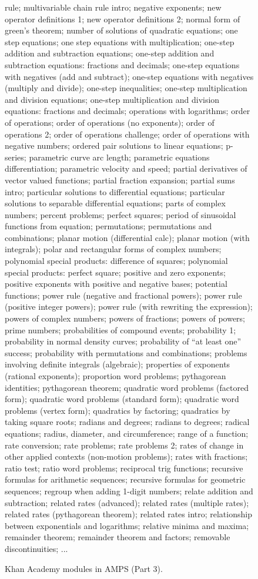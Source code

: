 \documentclass{article}
\begin{document}
\begin{figure*}
rule; multivariable chain rule intro; negative exponents; new operator definitions 1; new operator definitions 2; normal form of green's theorem; number of solutions of quadratic equations; one step equations; one step equations with multiplication; one-step addition and subtraction equations; one-step addition and subtraction equations: fractions and decimals; one-step equations with negatives (add and subtract); one-step equations with negatives (multiply and divide); one-step inequalities; one-step multiplication and division equations; one-step multiplication and division equations: fractions and decimals; operations with logarithms; order of operations; order of operations (no exponents); order of operations 2; order of operations challenge; order of operations with negative numbers; ordered pair solutions to linear equations; p-series; parametric curve arc length; parametric equations differentiation; parametric velocity and speed; partial derivatives of vector valued functions; partial fraction expansion; partial sums intro; particular solutions to differential equations; particular solutions to separable differential equations; parts of complex numbers; percent problems; perfect squares; period of sinusoidal functions from equation; permutations; permutations and combinations; planar motion (differential calc); planar motion (with integrals); polar and rectangular forms of complex numbers; polynomial special products: difference of squares; polynomial special products: perfect square; positive and zero exponents; positive exponents with positive and negative bases; potential functions; power rule (negative and fractional powers); power rule (positive integer powers); power rule (with rewriting the expression); powers of complex numbers; powers of fractions; powers of powers; prime numbers; probabilities of compound events; probability 1; probability in normal density curves; probability of ``at least one'' success; probability with permutations and combinations; problems involving definite integrals (algebraic); properties of exponents (rational exponents); proportion word problems; pythagorean identities; pythagorean theorem; quadratic word problems (factored form); quadratic word problems (standard form); quadratic word problems (vertex form); quadratics by factoring; quadratics by taking square roots; radians and degrees; radians to degrees; radical equations; radius, diameter, and circumference; range of a function; rate conversion; rate problems; rate problems 2; rates of change in other applied contexts (non-motion problems); rates with fractions; ratio test; ratio word problems; reciprocal trig functions; recursive formulas for arithmetic sequences; recursive formulas for geometric sequences; regroup when adding 1-digit numbers; relate addition and subtraction; related rates (advanced); related rates (multiple rates); related rates (pythagorean theorem); related rates intro; relationship between exponentials and logarithms; relative minima and maxima; remainder theorem; remainder theorem and factors; removable discontinuities; ...
    \caption{Khan Academy modules in AMPS (Part 3).}
    \label{fig:khan3}
\end{figure*}
\end{document}

